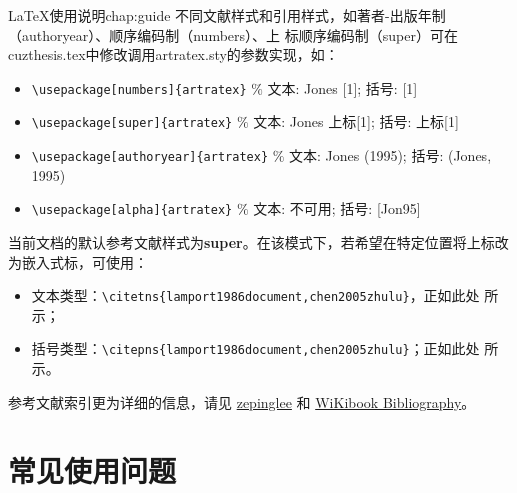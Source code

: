 \begin{cuzchapter}{\LaTeX{}使用说明}{chap:guide}
不同文献样式和引用样式，如著者-出版年制（authoryear）、顺序编码制（numbers）、上
标顺序编码制（super）可在cuzthesis.tex中修改调用artratex.sty的参数实现，如：
\begin{itemize}
    \item \verb+\usepackage[numbers]{artratex}+ $\%$ 文本: Jones [1]; 括号: [1]
    \item \verb+\usepackage[super]{artratex}+ $\%$ 文本: Jones 上标[1]; 括号: 上标[1]
    \item \verb+\usepackage[authoryear]{artratex}+ $\%$ 文本: Jones (1995); 括号: (Jones, 1995)
    \item \verb+\usepackage[alpha]{artratex}+ $\%$ 文本: 不可用; 括号: [Jon95]
\end{itemize}

当前文档的默认参考文献样式为\textbf{super}。在该模式下，若希望在特定位置将上标改
为嵌入式标，可使用：

\begin{itemize}
    \item 文本类型：\verb|\citetns{lamport1986document,chen2005zhulu}|，正如此处
    所示；
    \item 括号类型：\verb|\citepns{lamport1986document,chen2005zhulu}|；正如此处
    所示。
\end{itemize}

参考文献索引更为详细的信息，请见
\href{https://github.com/zepinglee/gbt7714-bibtex-style}{zepinglee} 和
\href{https://en.wikibooks.org/wiki/LaTeX/Bibliography_Management}{WiKibook
Bibliography}。


\section{常见使用问题}\label{sec:qa}


\end{cuzchapter}
